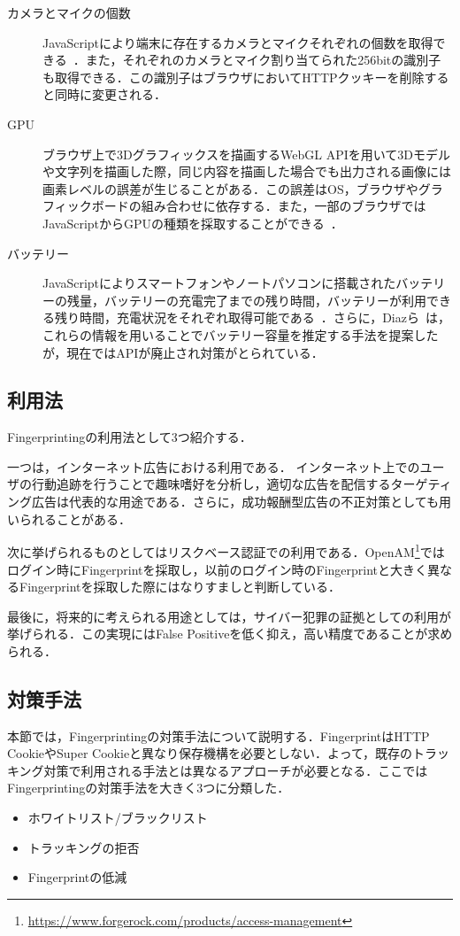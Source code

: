 \begin{description}
\item[カメラとマイクの個数]JavaScriptにより端末に存在するカメラとマイクそれぞれの個数を取得できる~\cite{takasu2015survey}．また，それぞれのカメラとマイク割り当てられた256bitの識別子も取得できる．この識別子はブラウザにおいてHTTPクッキーを削除すると同時に変更される．
\item[GPU]ブラウザ上で3Dグラフィックスを描画するWebGL APIを用いて3Dモデルや文字列を描画した際，同じ内容を描画した場合でも出力される画像には画素レベルの誤差が生じることがある．この誤差はOS，ブラウザやグラフィックボードの組み合わせに依存する．また，一部のブラウザではJavaScriptからGPUの種類を採取することができる~\cite{mowery2012pixel}．
\item[バッテリー]JavaScriptによりスマートフォンやノートパソコンに搭載されたバッテリーの残量，バッテリーの充電完了までの残り時間，バッテリーが利用できる残り時間，充電状況をそれぞれ取得可能である~\cite{takasu2015survey}．さらに，Diazら~\cite{diaz2015leaking}は，これらの情報を用いることでバッテリー容量を推定する手法を提案したが，現在ではAPIが廃止され対策がとられている．

\end{description}
\subsection{利用法}
Fingerprintingの利用法として3つ紹介する．

一つは，インターネット広告における利用である．
インターネット上でのユーザの行動追跡を行うことで趣味嗜好を分析し，適切な広告を配信するターゲティング広告は代表的な用途である．さらに，成功報酬型広告の不正対策としても用いられることがある．

次に挙げられるものとしてはリスクベース認証での利用である．OpenAM\footnote{\url{https://www.forgerock.com/products/access-management}}ではログイン時にFingerprintを採取し，以前のログイン時のFingerprintと大きく異なるFingerprintを採取した際にはなりすましと判断している．

最後に，将来的に考えられる用途としては，サイバー犯罪の証拠としての利用が挙げられる．この実現にはFalse Positiveを低く抑え，高い精度であることが求められる．
\subsection{対策手法}
本節では，Fingerprintingの対策手法について説明する．FingerprintはHTTP CookieやSuper Cookieと異なり保存機構を必要としない．よって，既存のトラッキング対策で利用される手法とは異なるアプローチが必要となる．ここではFingerprintingの対策手法を大きく3つに分類した．
\begin{itemize}
\item ホワイトリスト/ブラックリスト
\item トラッキングの拒否
\item Fingerprintの低減
\end{itemize}
